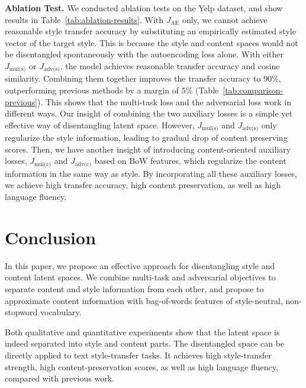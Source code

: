\documentclass[11pt,a4paper]{article}
\newcommand{\loss}[1]{J_{\text{#1}}}
\begin{document}
\textbf{Ablation Test.} We conducted ablation tests on the Yelp dataset, and show results in Table~\ref{tab:ablation-results}. With $\loss{AE}$ only, we cannot achieve reasonable style transfer accuracy by substituting an empirically estimated style vector of the target style.  This is because the style and content spaces would not be disentangled spontaneously with the autoencoding loss alone.
With either $\loss{mul(s)}$ or $\loss{adv(s)}$, the model achieves reasonable transfer accuracy and cosine similarity. Combining them together improves the transfer accuracy to 90\%, outperforming previous methods by a margin of $5\%$ (Table~\ref{tab:comparison-previous}). This shows that the multi-task loss and the adversarial loss work in different ways. Our insight of combining the two auxiliary losses is a simple yet effective way of disentangling latent space.
However, $\loss{mul(s)}$ and $\loss{adv(s)}$ only regularize the style information, leading to gradual drop of content preserving scores. Then, we have another insight of introducing content-oriented auxiliary losses, $\loss{mul(c)}$ and $\loss{adv(c)}$ based on BoW features, which regularize the content information in the same way as style. By incorporating all these auxiliary losses, we achieve high transfer accuracy, high content preservation, as well as high language fluency.

\section{Conclusion}
In this paper, we propose an effective approach for disentangling style and content latent spaces.
We combine multi-task and adversarial objectives to separate content and style information from each other, and propose to approximate content information with bag-of-words features of style-neutral, non-stopword vocabulary.

Both qualitative and quantitative experiments show that the latent space is indeed separated into style and content parts.
The disentangled space can be directly applied to text style-transfer tasks.
It achieves high style-transfer strength, high content-preservation scores, as well as high language fluency, compared with previous work.



\end{document}
